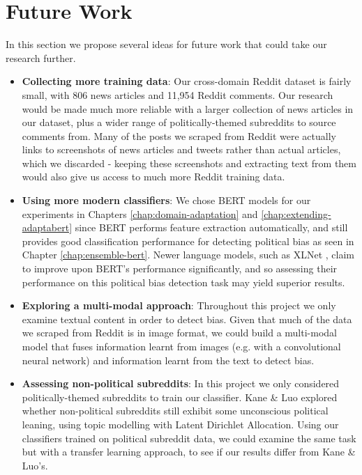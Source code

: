\section{Future Work}

In this section we propose several ideas for future work that could take our research further.

\begin{itemize}
    \item \textbf{Collecting more training data}: Our cross-domain Reddit dataset is fairly small, with 806 news articles and 11,954 Reddit comments. Our research would be made much more reliable with a larger collection of news articles in our dataset, plus a wider range of politically-themed subreddits to source comments from. Many of the posts we scraped from Reddit were actually links to screenshots of news articles and tweets rather than actual articles, which we discarded - keeping these screenshots and extracting text from them would also give us access to much more Reddit training data.
    \item \textbf{Using more modern classifiers}: We chose BERT models for our experiments in Chapters \ref{chap:domain-adaptation} and \ref{chap:extending-adaptabert} since BERT performs feature extraction automatically, and still provides good classification performance for detecting political bias as seen in Chapter \ref{chap:ensemble-bert}. Newer language models, such as XLNet \cite{xlnet}, claim to improve upon BERT's performance significantly, and so assessing their performance on this political bias detection task may yield superior results.
    \item \textbf{Exploring a multi-modal approach}: Throughout this project we only examine textual content in order to detect bias. Given that much of the data we scraped from Reddit is in image format, we could build a multi-modal model that fuses information learnt from images (e.g. with a convolutional neural network) and information learnt from the text to detect bias.
    \item \textbf{Assessing non-political subreddits}: In this project we only considered politically-themed subreddits to train our classifier. Kane \& Luo \cite{kane} explored whether non-political subreddits still exhibit some unconscious political leaning, using topic modelling with Latent Dirichlet Allocation. Using our classifiers trained on political subreddit data, we could examine the same task but with a transfer learning approach, to see if our results differ from Kane \& Luo's.

\end{itemize}
